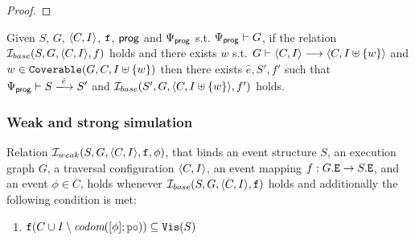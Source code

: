 \documentclass[12pt]{article}
\begin{document}
\begin{proof}






    
\end{proof}

\begin{lemma}
  \label{lemma:simb-issue-step}
  Given $S$, $G$, $\langle C, I \rangle$, ${\mathtt{f}}$, $\mathsf{prog}$ and $\Psi_{\mathsf{prog}}$
  s.t. $\Psi_{\mathsf{prog}} \vdash G$,
  if the relation $\mathcal{I}_{base}(S, G, \langle C, I \rangle, f)$ holds and
  there exists $w$ s.t. $G \vdash \langle C, I \rangle \longrightarrow \langle C, I \uplus \{w\} \rangle$
  and $w \in {\mathtt{Coverable}}(G, C, I \uplus \{w\})$
  then there exists $\hat{e}, S', f'$ such that
  $\Execs{\Prog} \vdash S \esstep{\hat{e}} S'$
  and $\mathcal{I}_{base}(S', G, \langle C, I \uplus \{w\} \rangle, f')$ holds.
\end{lemma}

\subsubsection{Weak and strong simulation}

\begin{definition}
  Relation $\mathcal{I}_{weak}(S, G, \langle C, I \rangle, {\mathtt{f}}, \phi)$, that binds an 
  event structure $S$, an \imm execution graph $G$,
  a traversal configuration $\langle C, I \rangle$,
  an event mapping $f : G.{\mathtt{E}} \rightarrow S.{\mathtt{E}}$,
  and an event $\phi \in C$,
  holds whenever $\mathcal{I}_{base}(S, G, \langle C, I \rangle, {\mathtt{f}})$ holds and
  additionally the following condition is met:
  \begin{enumerate}[label=\textbf{S$_{weak}$.\arabic*},start=8]
     
    \item \label{item:sim-vis-weak}
      $\lf(C \cup I \setminus \codom{[\phi];\lPO}) \subseteq \lVIS(S)$

  \end{enumerate}
\end{definition}
\end{document}
